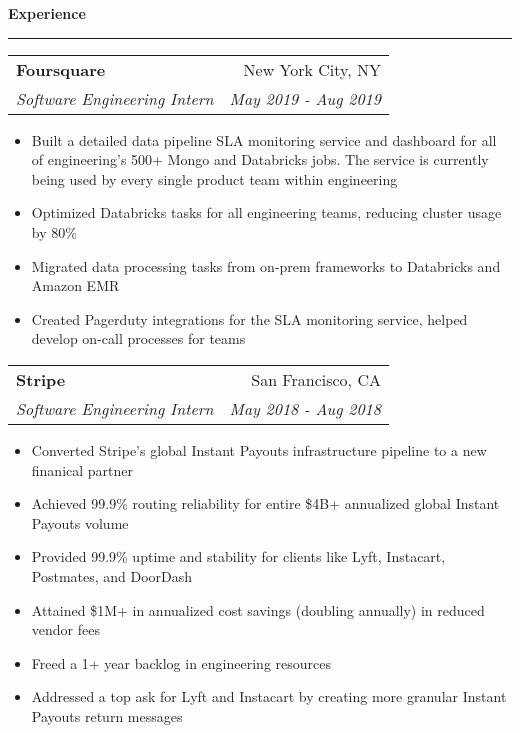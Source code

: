 \documentclass[11pt,letterpaper]{article}
\makeatletter
\newenvironment{topic}[1]
    {
    {\Large \centerline{#1}}
    \vspace*{0.03in}
    \hrule 
    \vspace*{0.05in}
    }
    {}
\newenvironment{event}
    {
    \begin{tabular*}{\textwidth}{l@{\extracolsep{\fill}}r}
    }
    {
    \end{tabular*}
    }
\makeatother
\begin{document}
    \begin{topic}{\textbf{Experience}}
        \begin{event}
            \textbf{Foursquare} & New York City, NY \\
            \emph{Software Engineering Intern} & \emph{May 2019 - Aug 2019} \\
        \end{event}
            \begin{itemize}
                \item Built a detailed data pipeline SLA monitoring service and dashboard for all of engineering's 500+ Mongo and Databricks jobs. The service is currently being used by every single product team within engineering
                \item Optimized Databricks tasks for all engineering teams, reducing cluster usage by 80\%
                \item Migrated data processing tasks from on-prem frameworks to Databricks and Amazon EMR
                \item Created Pagerduty integrations for the SLA monitoring service, helped develop on-call processes for teams
            \end{itemize}

        \begin{event}
            \textbf{Stripe} & San Francisco, CA \\
            \emph{Software Engineering Intern} & \emph{May 2018 - Aug 2018} \\
        \end{event}
            \begin{itemize}
                \item Converted Stripe's global Instant Payouts infrastructure pipeline to a new finanical partner
                \setlength{\itemindent}{0.21in}
                \item Achieved 99.9\% routing reliability for entire \$4B+ annualized global Instant Payouts volume
                \item Provided 99.9\% uptime and stability for clients like Lyft, Instacart, Postmates, and DoorDash
                \item Attained \$1M+ in annualized cost savings (doubling annually) in reduced vendor fees
                \item Freed a 1+ year backlog in engineering resources
                \setlength{\itemindent}{0in}
                \item Addressed a top ask for Lyft and Instacart by creating more granular Instant Payouts return messages
            \end{itemize}
            

\end{topic}
\end{document}
